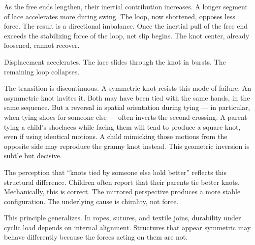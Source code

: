 As the free ends lengthen, their inertial contribution increases. A longer segment of lace accelerates more during swing. The loop, now shortened, opposes less force. The result is a directional imbalance. Once the inertial pull of the free end exceeds the stabilizing force of the loop, net slip begins. The knot center, already loosened, cannot recover.

Displacement accelerates. The lace slides through the knot in bursts. The remaining loop collapses.

The transition is discontinuous. A symmetric knot resists this mode of failure. An asymmetric knot invites it. Both may have been tied with the same hands, in the same sequence. But a reversal in spatial orientation during tying — in particular, when tying shoes for someone else — often inverts the second crossing. A parent tying a child’s shoelaces while facing them will tend to produce a square knot, even if using identical motions. A child mimicking those motions from the opposite side may reproduce the granny knot instead. This geometric inversion is subtle but decisive.

The perception that “knots tied by someone else hold better” reflects this structural difference. Children often report that their parents tie better knots. Mechanically, this is correct. The mirrored perspective produces a more stable configuration. The underlying cause is chirality, not force.

This principle generalizes. In ropes, sutures, and textile joins, durability under cyclic load depends on internal alignment. Structures that appear symmetric may behave differently because the forces acting on them are not.
\vspace{2em}